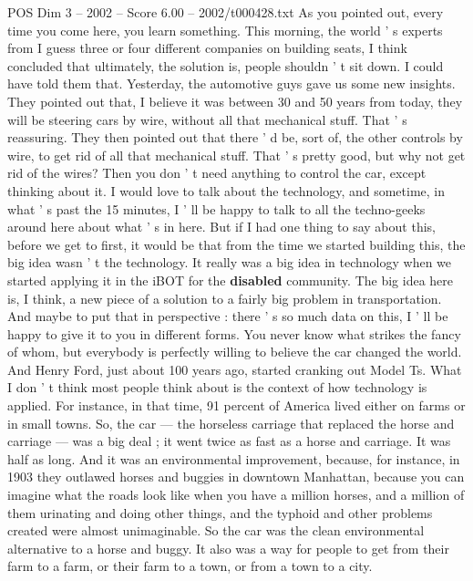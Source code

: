 \begin{textsample}{POS Dim 3 – 2002 – Score 6.00 – 2002/t000428.txt}  \label{ex:f3_pos_076}
As you pointed out, every time you come here, you learn something.
This morning, the world ' s experts from I guess three or four different companies on building seats, I think concluded that ultimately, the solution is, people shouldn ' t sit down.
I could have told them that.
Yesterday, the automotive guys gave us some new insights.
They pointed out that, I believe it was between 30 and 50 years from today, they will be steering cars by wire, without all that mechanical stuff.
That ' s reassuring.
They then pointed out that there ' d be, sort of, the other controls by wire, to get rid of all that mechanical stuff.
That ' s pretty good, but why not get rid of the wires?
Then you don ' t need anything to control the car, except thinking about it.
I would love to talk about the technology, and sometime, in what ' s past the 15 minutes, I ' ll be happy to talk to all the techno-geeks around here about what ' s in here.
But if I had one thing to say about this, before we get to first, it would be that from the time we started building this, the big idea wasn ' t the technology.
It really was a big idea in technology when we started applying it in the iBOT for the \textbf{disabled} community.
The big idea here is, I think, a new piece of a solution to a fairly big problem in transportation.
And maybe to put that in perspective : there ' s so much data on this, I ' ll be happy to give it to you in different forms.
You never know what strikes the fancy of whom, but everybody is perfectly willing to believe the car changed the world.
And Henry Ford, just about 100 years ago, started cranking out Model Ts.
What I don ' t think most people think about is the context of how technology is applied.
For instance, in that time, 91 percent of America lived either on farms or in small towns.
So, the car — the horseless carriage that replaced the horse and carriage — was a big deal ; it went twice as fast as a horse and carriage.
It was half as long.
And it was an environmental improvement, because, for instance, in 1903 they outlawed horses and buggies in downtown Manhattan, because you can imagine what the roads look like when you have a million horses, and a million of them urinating and doing other things, and the typhoid and other problems created were almost unimaginable.
So the car was the clean environmental alternative to a horse and buggy.
It also was a way for people to get from their farm to a farm, or their farm to a town, or from a town to a city.

\end{textsample}
